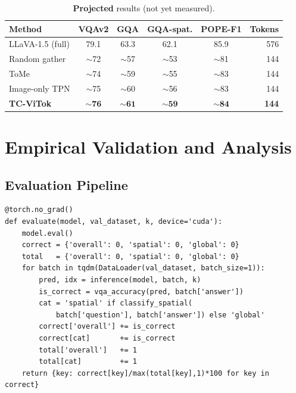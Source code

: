 \documentclass[11pt,a4paper]{article}
\begin{document}
\begin{table}[h]
\centering
\caption{\textbf{Projected} results (not yet measured).}
\label{tab:projected}
\renewcommand{\arraystretch}{1.2}
\small
\begin{tabular}{@{}lccccr@{}}
  \toprule
  Method & VQAv2 & GQA & GQA-spat. & POPE-F1 & Tokens \\
  \midrule
  LLaVA-1.5 (full) & 79.1 & 63.3 & 62.1 & 85.9 & 576 \\
  Random gather    & $\sim$72 & $\sim$57 & $\sim$53 & $\sim$81 & 144 \\
  ToMe             & $\sim$74 & $\sim$59 & $\sim$55 & $\sim$83 & 144 \\
  Image-only TPN   & $\sim$75 & $\sim$60 & $\sim$56 & $\sim$83 & 144 \\
  \textbf{TC-ViTok} & $\mathbf{\sim\!76}$ & $\mathbf{\sim\!61}$
    & $\mathbf{\sim\!59}$ & $\mathbf{\sim\!84}$ & \textbf{144} \\
  \bottomrule
\end{tabular}
\end{table}

\section{Empirical Validation and Analysis}
\label{sec:validation}

\subsection{Evaluation Pipeline}

\begin{lstlisting}[caption={Evaluation with spatial stratification.}]
@torch.no_grad()
def evaluate(model, val_dataset, k, device='cuda'):
    model.eval()
    correct = {'overall': 0, 'spatial': 0, 'global': 0}
    total   = {'overall': 0, 'spatial': 0, 'global': 0}
    for batch in tqdm(DataLoader(val_dataset, batch_size=1)):
        pred, idx = inference(model, batch, k)
        is_correct = vqa_accuracy(pred, batch['answer'])
        cat = 'spatial' if classify_spatial(
            batch['question'], batch['answer']) else 'global'
        correct['overall'] += is_correct
        correct[cat]       += is_correct
        total['overall']   += 1
        total[cat]         += 1
    return {key: correct[key]/max(total[key],1)*100 for key in correct}
\end{lstlisting}
\end{document}
